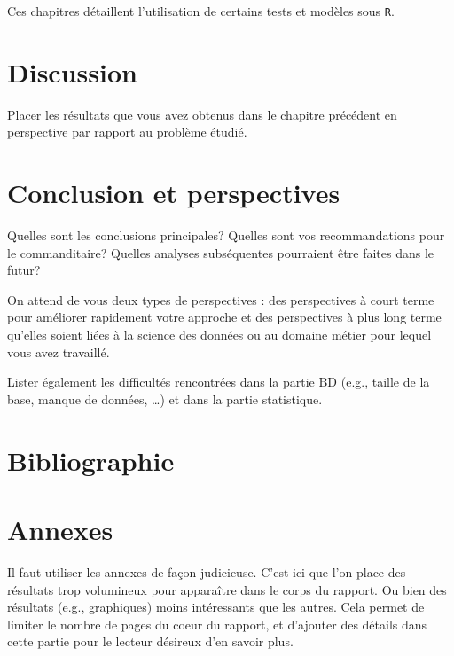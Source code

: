 \documentclass[mstat,12pt]{unswthesis}
\begin{document}
Ces chapitres détaillent l'utilisation de certains tests et modèles sous
\texttt{R}.

\chapter{Discussion}\label{discussion}

Placer les résultats que vous avez obtenus dans le chapitre précédent en
perspective par rapport au problème étudié.

\chapter{Conclusion et perspectives}\label{conclusion-et-perspectives}

Quelles sont les conclusions principales? Quelles sont vos
recommandations pour le commanditaire? Quelles analyses subséquentes
pourraient être faites dans le futur?

\bigskip

On attend de vous deux types de perspectives : des perspectives à court
terme pour améliorer rapidement votre approche et des perspectives à
plus long terme qu'elles soient liées à la science des données ou au
domaine métier pour lequel vous avez travaillé.

\bigskip

Lister également les difficultés rencontrées dans la partie BD (e.g.,
taille de la base, manque de données, \ldots) et dans la partie
statistique.

\chapter*{Bibliographie}\label{bibliographie}

\label{refs}
\begin{CSLReferences}{0}{1}
\end{CSLReferences}




\chapter*{Annexes}\label{annexes}

Il faut utiliser les annexes de façon judicieuse. C'est ici que l'on
place des résultats trop volumineux pour apparaître dans le corps du
rapport. Ou bien des résultats (e.g., graphiques) moins intéressants que
les autres. Cela permet de limiter le nombre de pages du coeur du
rapport, et d'ajouter des détails dans cette partie pour le lecteur
désireux d'en savoir plus.
\end{document}
